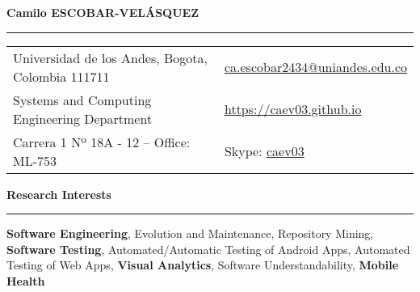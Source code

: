 \documentclass[letterpaper,11pt,oneside]{article}
\newcommand*{\Skype}{\href{skype:caev03?add}{caev03}}
\newcommand{\Absender}[1][\normalsize]{\Skype}
\begin{document}

\noindent \Huge{\textbf{Camilo ESCOBAR-VEL\'{A}SQUEZ}} \\
\vspace{-2ex}
\hrule 
\normalsize


\begin{center}
\begin{tabular}{ll}
 Universidad de los Andes, Bogota, Colombia 111711   & \hspace{0.5in} \href{mailto:ca.escobar2434@uniandes.edu.co}{ca.escobar2434@uniandes.edu.co} \\
 Systems and Computing Engineering Department    & \hspace{0.5in}  \href{https://caev03.github.io}{https://caev03.github.io}   \\
 Carrera 1 Nº 18A - 12 --	Office: ML-753           & \hspace{0.5in} Skype: \Absender  \\
\end{tabular}
\end{center}

\vspace{2em}

\noindent \Large{\textbf{Research Interests}} \\
\vspace{-2ex}
\hrule 
\normalsize
\vspace{2ex}
\noindent \textbf{Software Engineering}, Evolution and Maintenance, Repository Mining, \textbf{Software Testing}, Automated/Automatic Testing of Android Apps, Automated Testing of Web Apps, \textbf{Visual Analytics}, Software Understandability, \textbf{Mobile Health} \\
\\
\end{document}
